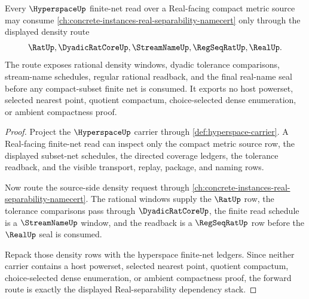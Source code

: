 \begin{theorem}
\label{thm:hyperspace-real-separability-forward-route}
Every $\HyperspaceUp$ finite-net read over a Real-facing compact metric source may consume \autoref{ch:concrete-instances-real-separability-namecert} only through the displayed density route
$$
\RatUp,\DyadicRatCoreUp,\StreamNameUp,\RegSeqRatUp,\RealUp .
$$
The route exposes rational density windows, dyadic tolerance comparisons, stream-name schedules, regular rational readback, and the final real-name seal before any compact-subset finite net is consumed. It exports no host powerset, selected nearest point, quotient compactum, choice-selected dense enumeration, or ambient compactness proof.
\end{theorem}
\begin{proof}
Project the $\HyperspaceUp$ carrier through \autoref{def:hyperspace-carrier}. A Real-facing finite-net read can inspect only the compact metric source row, the displayed subset-net schedules, the directed coverage ledgers, the tolerance readback, and the visible transport, replay, package, and naming rows.

Now route the source-side density request through \autoref{ch:concrete-instances-real-separability-namecert}. The rational windows supply the $\RatUp$ row, the tolerance comparisons pass through $\DyadicRatCoreUp$, the finite read schedule is a $\StreamNameUp$ window, and the readback is a $\RegSeqRatUp$ row before the $\RealUp$ seal is consumed.

Repack those density rows with the hyperspace finite-net ledgers. Since neither carrier contains a host powerset, selected nearest point, quotient compactum, choice-selected dense enumeration, or ambient compactness proof, the forward route is exactly the displayed Real-separability dependency stack.
\end{proof}
